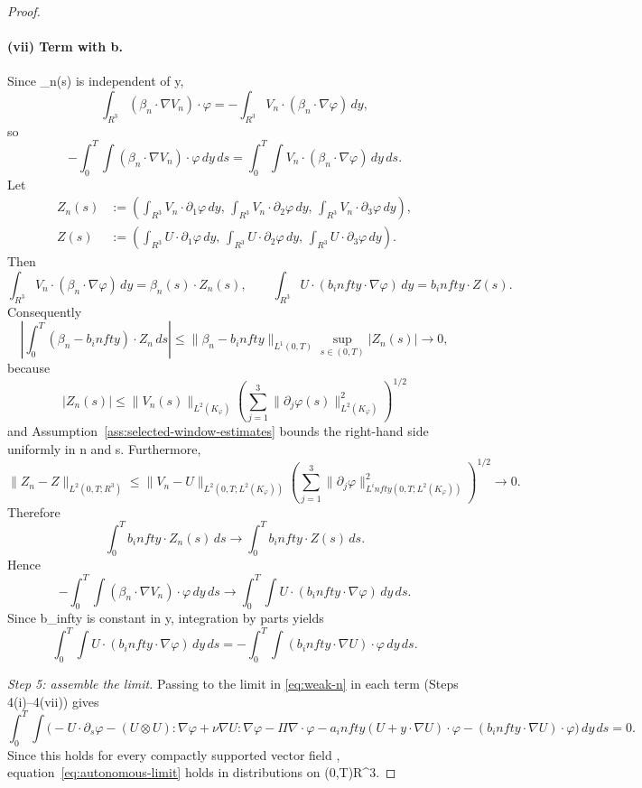 \documentclass[11pt]{amsart}
\def\({}%
\def\){}%
\def\mathbb#1{#1}%
\def\infty{infty}%
\theoremstyle{plain}
\theoremstyle{definition}
\theoremstyle{remark}
\begin{document}
\begin{proof}
\paragraph{(vii) Term with \(b\).}
Since \(\beta_n(s)\) is independent of \(y\),
\[
  \int_{\mathbb R^3}(\beta_n\cdot\nabla V_n)\cdot\varphi
  =-\int_{\mathbb R^3}V_n\cdot(\beta_n\cdot\nabla\varphi)
  \,dy,
\]
so
\[
  -\int_0^T\!\int(\beta_n\cdot\nabla V_n)\cdot\varphi
  \,dy\,ds
  =
  \int_0^T\!\int V_n\cdot(\beta_n\cdot\nabla\varphi)
  \,dy\,ds.
\]
Let
\[
\begin{aligned}
Z_n(s)&:=\left(\int_{\mathbb R^3}V_n\cdot\partial_1\varphi\,dy,\,
\int_{\mathbb R^3}V_n\cdot\partial_2\varphi\,dy,\,
\int_{\mathbb R^3}V_n\cdot\partial_3\varphi\,dy\right),\\
Z(s)&:=\left(\int_{\mathbb R^3}U\cdot\partial_1\varphi\,dy,\,
\int_{\mathbb R^3}U\cdot\partial_2\varphi\,dy,\,
\int_{\mathbb R^3}U\cdot\partial_3\varphi\,dy\right).
\end{aligned}
\]
Then
\[
  \int_{\mathbb R^3}V_n\cdot(\beta_n\cdot\nabla\varphi)\,dy
  =\beta_n(s)\cdot Z_n(s),\qquad
  \int_{\mathbb R^3}U\cdot(b_\infty\cdot\nabla\varphi)\,dy
  =b_\infty\cdot Z(s).
\]
Consequently
\[
  \left|\int_0^T\!(\beta_n-b_\infty)\cdot Z_n\,ds\right|
  \le
  \|\beta_n-b_\infty\|_{L^1(0,T)}\sup_{s\in(0,T)}|Z_n(s)|\to0,
\]
because
\[
  |Z_n(s)|\le
  \|V_n(s)\|_{L^2(K_\varphi)}
  \left(\sum_{j=1}^3\|\partial_j\varphi(s)\|_{L^2(K_\varphi)}^2\right)^{1/2}
\]
and Assumption~\ref{ass:selected-window-estimates} bounds the right-hand side
uniformly in \(n\) and \(s\). Furthermore,
\[
  \|Z_n-Z\|_{L^2(0,T;\mathbb R^3)}
  \le
  \|V_n-U\|_{L^2(0,T;L^2(K_\varphi))}
  \left(\sum_{j=1}^3\|\partial_j\varphi\|_{L^\infty(0,T;L^2(K_\varphi))}^2\right)^{1/2}
  \to0.
\]
Therefore
\[
  \int_0^T b_\infty\cdot Z_n(s)\,ds
  \to
  \int_0^T b_\infty\cdot Z(s)\,ds.
\]
Hence
\[
  -\int_0^T\!\int (\beta_n\cdot\nabla V_n)\cdot\varphi
  \,dy\,ds
  \to
  \int_0^T\!\int U\cdot(b_\infty\cdot\nabla\varphi)
  \,dy\,ds.
\]
Since \(b_\infty\) is constant in \(y\), integration by parts yields
\[
  \int_0^T\!\int U\cdot(b_\infty\cdot\nabla\varphi)
  \,dy\,ds
  =
  -\int_0^T\!\int (b_\infty\cdot\nabla U)\cdot\varphi
  \,dy\,ds.
\]

\emph{Step 5: assemble the limit.}
Passing to the limit in \eqref{eq:weak-n} in each term (Steps 4(i)--4(vii)) gives
\[
  \int_0^T\!\int
  \bigl(
  -U\cdot\partial_s\varphi
  -(U\otimes U):\nabla\varphi
  +\nu\nabla U:\nabla\varphi
  -\Pi\nabla\cdot\varphi
  -a_\infty(U+y\cdot\nabla U)\cdot\varphi
  -(b_\infty\cdot\nabla U)\cdot\varphi
  \bigr)
  \,dy\,ds=0.
\]
Since this holds for every compactly supported vector field \(\varphi\), equation~\eqref{eq:autonomous-limit} holds in distributions on
\((0,T)\times\mathbb R^3\).
\end{proof}
\end{document}
